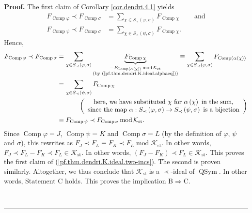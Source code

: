 \documentclass[numbers=enddot,12pt,final,onecolumn,notitlepage]{scrartcl}%
\theoremstyle{definition}
\newenvironment{proof}[1][Proof]{\noindent\textbf{#1.} }{\ \rule{0.5em}{0.5em}}
\let\sumnonlimits\sum
\renewcommand{\sum}{\sumnonlimits\limits}
\begin{document}
\begin{proof}
The first claim of Corollary \ref{cor.dendri.4.1} yields%
\begin{align*}
F_{\operatorname*{Comp}\varphi}\left.  \prec\right.  F_{\operatorname*{Comp}%
\sigma}  &  =\sum_{\chi\in S_{\prec}\left(  \varphi,\sigma\right)
}F_{\operatorname*{Comp}\chi}\ \ \ \ \ \ \ \ \ \ \text{and}\\
F_{\operatorname*{Comp}\psi}\left.  \prec\right.  F_{\operatorname*{Comp}%
\sigma}  &  =\sum_{\chi\in S_{\prec}\left(  \psi,\sigma\right)  }%
F_{\operatorname*{Comp}\chi}.
\end{align*}
Hence,%
\begin{align*}
F_{\operatorname*{Comp}\varphi}\left.  \prec\right.  F_{\operatorname*{Comp}%
\sigma}  &  =\sum_{\chi\in S_{\prec}\left(  \varphi,\sigma\right)
}\underbrace{F_{\operatorname*{Comp}\chi}}_{\substack{\equiv
F_{\operatorname*{Comp}\left(  \alpha\left(  \chi\right)  \right)
}\operatorname{mod}\mathcal{K}_{\operatorname*{st}}\\\text{(by
(\ref{pf.thm.dendri.K.ideal.alphaeq}))}}}\equiv\sum_{\chi\in S_{\prec}\left(
\varphi,\sigma\right)  }F_{\operatorname*{Comp}\left(  \alpha\left(
\chi\right)  \right)  }\\
&  =\sum_{\chi\in S_{\prec}\left(  \psi,\sigma\right)  }%
F_{\operatorname*{Comp}\chi}\\
&  \ \ \ \ \ \ \ \ \ \ \left(
\begin{array}
[c]{c}%
\text{here, we have substituted }\chi\text{ for }\alpha\left(  \chi\right)
\text{ in the sum,}\\
\text{since the map }\alpha:S_{\prec}\left(  \varphi,\sigma\right)
\rightarrow S_{\prec}\left(  \psi,\sigma\right)  \text{ is a bijection}%
\end{array}
\right) \\
&  =F_{\operatorname*{Comp}\psi}\left.  \prec\right.  F_{\operatorname*{Comp}%
\sigma}\operatorname{mod}\mathcal{K}_{\operatorname*{st}}.
\end{align*}
Since $\operatorname*{Comp}\varphi=J$, $\operatorname*{Comp}\psi=K$ and
$\operatorname*{Comp}\sigma=L$ (by the definition of $\varphi$, $\psi$ and
$\sigma$), this rewrites as $F_{J}\left.  \prec\right.  F_{L}\equiv
F_{K}\left.  \prec\right.  F_{L}\operatorname{mod}\mathcal{K}%
_{\operatorname*{st}}$. In other words, $F_{J}\left.  \prec\right.
F_{L}-F_{K}\left.  \prec\right.  F_{L}\in\mathcal{K}_{\operatorname*{st}}$. In
other words, $\left(  F_{J}-F_{K}\right)  \left.  \prec\right.  F_{L}%
\in\mathcal{K}_{\operatorname*{st}}$. This proves the first claim of
(\ref{pf.thm.dendri.K.ideal.two-incs}). The second is proven similarly.
Altogether, we thus conclude that $\mathcal{K}_{\operatorname*{st}}$ is a
$\left.  \prec\right.  $-ideal of $\operatorname*{QSym}$. In other words,
Statement C holds. This proves the implication B$\Longrightarrow$C.


\end{proof}
\end{document}
